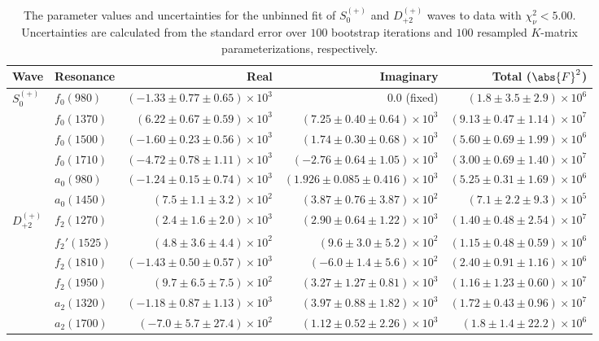 \begin{table}[ht]
    \begin{center}
        \begin{tabular}{llrrr}\toprule
        Wave & Resonance & Real & Imaginary & Total ($\abs{F}^2$) \\\midrule
$S_{0}^{(+)}$ & $f_{0}(980)$ & $(-1.33 \pm 0.77 \pm 0.65) \times 10^{3}$ & $0.0$ (fixed) & $(1.8 \pm 3.5 \pm 2.9) \times 10^{6}$ \\
 & $f_{0}(1370)$ & $(6.22 \pm 0.67 \pm 0.59) \times 10^{3}$ & $(7.25 \pm 0.40 \pm 0.64) \times 10^{3}$ & $(9.13 \pm 0.47 \pm 1.14) \times 10^{7}$ \\
 & $f_{0}(1500)$ & $(-1.60 \pm 0.23 \pm 0.56) \times 10^{3}$ & $(1.74 \pm 0.30 \pm 0.68) \times 10^{3}$ & $(5.60 \pm 0.69 \pm 1.99) \times 10^{6}$ \\
 & $f_{0}(1710)$ & $(-4.72 \pm 0.78 \pm 1.11) \times 10^{3}$ & $(-2.76 \pm 0.64 \pm 1.05) \times 10^{3}$ & $(3.00 \pm 0.69 \pm 1.40) \times 10^{7}$ \\
 & $a_{0}(980)$ & $(-1.24 \pm 0.15 \pm 0.74) \times 10^{3}$ & $(1.926 \pm 0.085 \pm 0.416) \times 10^{3}$ & $(5.25 \pm 0.31 \pm 1.69) \times 10^{6}$ \\
 & $a_{0}(1450)$ & $(7.5 \pm 1.1 \pm 3.2) \times 10^{2}$ & $(3.87 \pm 0.76 \pm 3.87) \times 10^{2}$ & $(7.1 \pm 2.2 \pm 9.3) \times 10^{5}$ \\
$D_{+2}^{(+)}$ & $f_{2}(1270)$ & $(2.4 \pm 1.6 \pm 2.0) \times 10^{3}$ & $(2.90 \pm 0.64 \pm 1.22) \times 10^{3}$ & $(1.40 \pm 0.48 \pm 2.54) \times 10^{7}$ \\
 & $f_{2}'(1525)$ & $(4.8 \pm 3.6 \pm 4.4) \times 10^{2}$ & $(9.6 \pm 3.0 \pm 5.2) \times 10^{2}$ & $(1.15 \pm 0.48 \pm 0.59) \times 10^{6}$ \\
 & $f_{2}(1810)$ & $(-1.43 \pm 0.50 \pm 0.57) \times 10^{3}$ & $(-6.0 \pm 1.4 \pm 5.6) \times 10^{2}$ & $(2.40 \pm 0.91 \pm 1.16) \times 10^{6}$ \\
 & $f_{2}(1950)$ & $(9.7 \pm 6.5 \pm 7.5) \times 10^{2}$ & $(3.27 \pm 1.27 \pm 0.81) \times 10^{3}$ & $(1.16 \pm 1.23 \pm 0.60) \times 10^{7}$ \\
 & $a_{2}(1320)$ & $(-1.18 \pm 0.87 \pm 1.13) \times 10^{3}$ & $(3.97 \pm 0.88 \pm 1.82) \times 10^{3}$ & $(1.72 \pm 0.43 \pm 0.96) \times 10^{7}$ \\
 & $a_{2}(1700)$ & $(-7.0 \pm 5.7 \pm 27.4) \times 10^{2}$ & $(1.12 \pm 0.52 \pm 2.26) \times 10^{3}$ & $(1.8 \pm 1.4 \pm 22.2) \times 10^{6}$ \\\bottomrule
        \end{tabular}
    \caption{The parameter values and uncertainties for the unbinned fit of $S_{0}^{(+)}$ and $D_{+2}^{(+)}$ waves to data with $\chi^2_\nu < 5.00$. Uncertainties are calculated from the standard error over $100$ bootstrap iterations and $100$ resampled $K$-matrix parameterizations, respectively.}\label{tab:unbinned-fit-chisqdof-5.0-resampled-Sp0p-Dp2p}
    \end{center}
\end{table}

